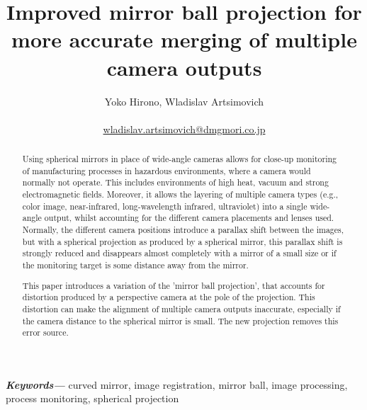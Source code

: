 \documentclass[10pt]{article}
\providecommand{\keywords}[1]
{
  \small	
  \textbf{\textit{Keywords---}} #1
}
\begin{document}
\title{Improved mirror ball projection for more accurate merging of multiple camera outputs}

\author{Yoko Hirono, Wladislav Artsimovich \\
	\\
	\href{mailto:wladislav.artsimovich@dmgmori.co.jp}{wladislav.artsimovich@dmgmori.co.jp}  \\
}

\maketitle

\begin{abstract}
	Using spherical mirrors in place of wide-angle cameras allows for close-up monitoring of manufacturing processes in hazardous environments, where a camera would normally not operate. This includes environments of high heat, vacuum and strong electromagnetic fields. Moreover, it allows the layering of multiple camera types (e.g., color image, near-infrared, long-wavelength infrared, ultraviolet) into a single wide-angle output, whilst accounting for the different camera placements and lenses used. Normally, the different camera positions introduce a parallax shift between the images, but with a spherical projection as produced by a spherical mirror, this parallax shift is strongly reduced and disappears almost completely with a mirror of a small size or if the monitoring target is some distance away from the mirror.

	This paper introduces a variation of the 'mirror ball projection', that accounts for distortion produced by a perspective camera at the pole of the projection. This distortion can make the alignment of multiple camera outputs inaccurate, especially if the camera distance to the spherical mirror is small. The new projection removes this error source.
\end{abstract}

\keywords{curved mirror, image registration, mirror ball, image processing, process monitoring, spherical projection}
\end{document}

